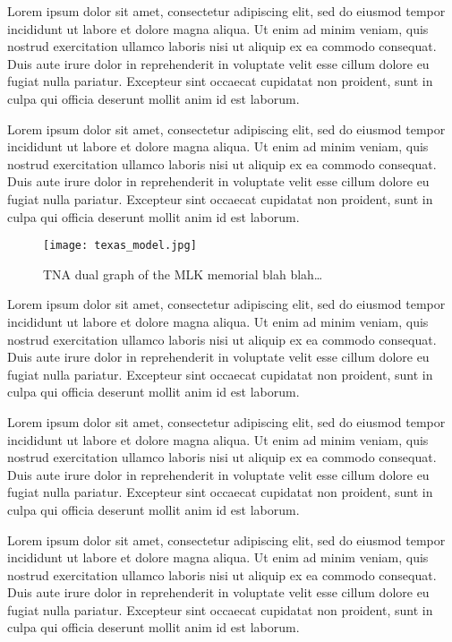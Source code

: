  Lorem ipsum dolor  sit amet, consectetur adipiscing elit, sed do
 eiusmod tempor incididunt ut labore et dolore magna aliqua. Ut enim ad minim veniam, quis nostrud exercitation ullamco laboris nisi ut aliquip ex ea commodo consequat. Duis aute irure dolor in reprehenderit in voluptate velit esse cillum dolore eu fugiat nulla pariatur. Excepteur sint occaecat cupidatat non proident, sunt in culpa qui officia deserunt mollit anim id est laborum.

  Lorem ipsum dolor sit amet, consectetur adipiscing elit, sed do eiusmod tempor
 incididunt ut labore et dolore magna aliqua. Ut enim ad minim veniam, quis nostrud exercitation ullamco laboris nisi ut aliquip ex ea commodo consequat. Duis aute irure dolor in reprehenderit in voluptate velit esse cillum dolore eu fugiat nulla pariatur. Excepteur sint occaecat cupidatat non proident, sunt in culpa qui officia deserunt mollit anim id est laborum.
 
\begin{figure}[ht]%
\begin{center}
\begin{center}\texttt{[image: texas\_model.jpg]}\end{center}
\caption{TNA dual graph of the MLK memorial blah blah\ldots}
\label{fig:texas_model}
\end{center}
\end{figure}
 
 
  Lorem ipsum dolor sit amet, consectetur adipiscing elit, sed do eiusmod tempor
 incididunt ut labore et dolore magna aliqua. Ut enim ad minim veniam, quis nostrud exercitation ullamco laboris nisi ut aliquip ex ea commodo consequat. Duis aute irure dolor in reprehenderit in voluptate velit esse cillum dolore eu fugiat nulla pariatur. Excepteur sint occaecat cupidatat non proident, sunt in culpa qui officia deserunt mollit anim id est laborum.
 
  Lorem ipsum dolor sit amet, consectetur adipiscing elit, sed do eiusmod tempor
 incididunt ut labore et dolore magna aliqua. Ut enim ad minim veniam, quis nostrud exercitation ullamco laboris nisi ut aliquip ex ea commodo consequat. Duis aute irure dolor in reprehenderit in voluptate velit esse cillum dolore eu fugiat nulla pariatur. Excepteur sint occaecat cupidatat non proident, sunt in culpa qui officia deserunt mollit anim id est laborum.
 
  Lorem ipsum dolor sit amet, consectetur adipiscing elit, sed do eiusmod tempor
 incididunt ut labore et dolore magna aliqua. Ut enim ad minim veniam, quis nostrud exercitation ullamco laboris nisi ut aliquip ex ea commodo consequat. Duis aute irure dolor in reprehenderit in voluptate velit esse cillum dolore eu fugiat nulla pariatur. Excepteur sint occaecat cupidatat non proident, sunt in culpa qui officia deserunt mollit anim id est laborum.
 
